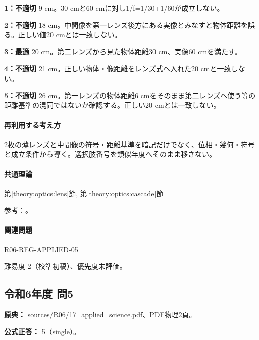 \noindent\textbf{1：不適切} 9 cm。30 cmと60 cmに対し1/f=\allowbreak{}1/30+1/60が成立しない。\par

\noindent\textbf{2：不適切} 18 cm。中間像を第一レンズ後方にある実像とみなすと物体距離を誤る。正しい値20 cmとは一致しない。\par

\noindent\textbf{3：最適} 20 cm。第二レンズから見た物体距離30 cm、実像60 cmを満たす。\par

\noindent\textbf{4：不適切} 21 cm。正しい物体・像距離をレンズ式へ入れた20 cmと一致しない。\par

\noindent\textbf{5：不適切} 26 cm。第一レンズの物体距離6 cmをそのまま第二レンズへ使う等の距離基準の混同ではないか確認する。正しい20 cmとは一致しない。\par

\paragraph{再利用する考え方} 2枚の薄レンズと中間像の符号・距離基準を暗記だけでなく、位相・幾何・符号と成立条件から導く。選択肢番号を類似年度へそのまま移さない。

\paragraph{共通理論} \hyperref[theory:optics:lens]{第\ref*{theory:optics:lens}節}, \hyperref[theory:optics:cascade]{第\ref*{theory:optics:cascade}節}

\par 参考：\cite{os_lens}。

\paragraph{関連問題} \hyperref[q:r06-reg-applied-05]{R06-REG-APPLIED-05}

\par 難易度 2（校準初稿）、優先度未評価。

\subsection{令和6年度 問5}
\label{q:r06-reg-applied-05}

\noindent\textbf{原典：} sources/R06/17\_applied\_science.pdf、PDF物理2頁。

\textbf{公式正答：} 5（single）。

